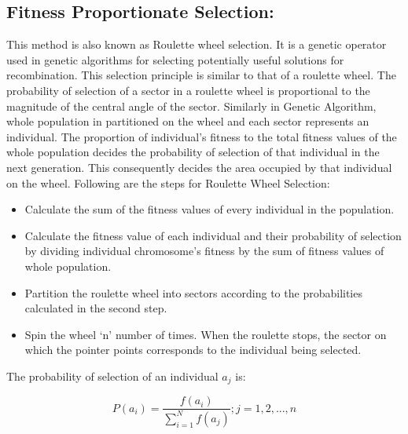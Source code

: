 \documentclass[a4paper, 12pt]{article}
\begin{document}
\subsection{Fitness Proportionate Selection:}
This method is also known as Roulette wheel selection. It is a genetic operator used in genetic algorithms for selecting potentially useful 
solutions for recombination. This selection principle is similar to that of a roulette wheel. The probability of selection of a sector in a 
roulette wheel is proportional to the magnitude of the central angle of the sector. Similarly in Genetic Algorithm, whole population in
partitioned on the wheel and each sector represents an individual. The proportion of individual’s fitness to the total fitness values of the 
 whole population decides the probability of selection of that individual in the next generation. This consequently decides the area occupied 
by that individual on the wheel. Following are the steps for Roulette Wheel Selection:
\begin{itemize}
\item Calculate the sum of the fitness values of every individual in the population.
\item Calculate the fitness value of each individual and their probability of selection by dividing individual chromosome’s fitness by the sum 
of fitness values of whole population.
\item Partition the roulette wheel into sectors according to the probabilities calculated in the second step.
\item Spin the wheel ‘n’ number of times. When the roulette stops, the sector on which the pointer points corresponds to the individual being 
selected.
\end{itemize}
The probability of selection of an individual $a_j$ is:
\begin{large}
\boldmath\begin{equation*}
P\left(a_{i}\right) = \frac{f\left(a_{i}\right)}{\sum_{i=1}^{N}f\left(a_j\right)}; j=1,2,...,n 
\end{equation*}
\end{large}
\end{document}
